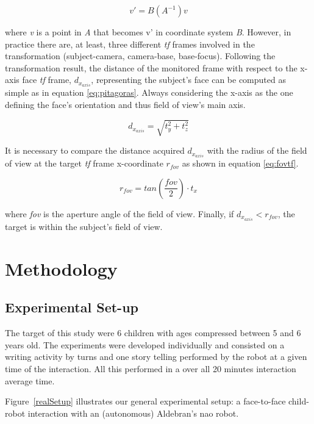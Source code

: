\documentclass{sig-alternate}
\begin{document}
\begin{equation}
v' = B(A^{-1})v
\label{eq:transform}
\end{equation}

where \textit{v} is a point in \textit{A} that becomes v' in coordinate system \textit{B}. However, in practice there are, at least, three different \textit{tf} frames involved in the transformation (subject-camera, camera-base, base-focus). Following the transformation result, the distance of the monitored frame with respect to the x-axis face \textit{tf} frame, $ d_{x_{axis}} $, representing the subject's face can be computed as simple as in equation \ref{eq:pitagoras}. Always considering the x-axis as the one defining the face's orientation and thus field of view's main axis.

\begin{equation}
d_{x_{axis}} = \sqrt{t_y^2 + t_z^2}
\label{eq:pitagoras}
\end{equation}

It is necessary to compare the distance acquired $ d_{x_{axis}} $ with the radius of the field of view at the target \textit{tf} frame x-coordinate $ r_{fov} $ as shown in equation \ref{eq:fovtf}.

\begin{equation}
r_{fov} = tan\left(\frac{fov}{2}\right) \cdot t_x
\label{eq:fovtf}
\end{equation}

where \textit{fov} is the aperture angle of the field of view. Finally, if $ d_{x_{axis}}<r_{fov} $, the target is within the subject's field of view.



\section{Methodology}
\subsection{Experimental Set-up}

The target of this study were 6 children with ages compressed between 5 and 6 years old. The experiments were developed individually and consisted on a writing activity by turns and one story telling performed by the robot at a given time of the interaction. All this performed in a over all 20 minutes interaction average time.

Figure~\ref{realSetup} illustrates our general experimental setup: a
face-to-face child-robot interaction with an (autonomous) Aldebran's {\sc nao}
robot.
\end{document}
